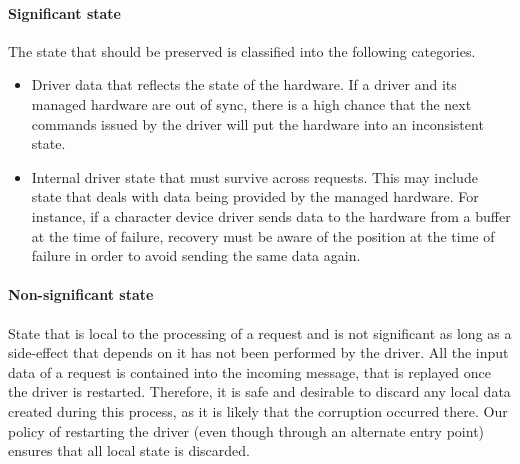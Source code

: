 \documentclass{report}
\begin{document}
\paragraph{Significant state}
The state that should be preserved is classified into the following categories.
\begin{itemize}
\item Driver data that reflects the state of the hardware.  If a driver and its managed hardware are out of sync, there is a high chance that the next commands issued by the driver will put the hardware into an inconsistent state.
\item Internal driver state that must survive across requests. This may include state that deals with data being provided by the managed hardware. For instance, if a character device driver sends data to the hardware from a buffer at the time of failure, recovery must be aware of the position at the time of failure in order to avoid sending the same data again.
\end{itemize}

\paragraph{Non-significant state}
State that is local to the processing of a request and is not significant as long as a side-effect that depends on it has not been performed by the driver. All the input data of a request is contained into the incoming message, that is replayed once the driver is restarted. Therefore, it is safe and desirable to discard any local data created during this process, as it is likely that the corruption occurred there. Our policy of restarting the driver (even though through an alternate entry point) ensures that all local state is discarded.

\end{document}
